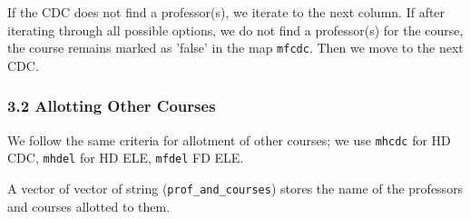 \documentclass{article}
\begin{document}
If the CDC does not find a professor(s), we iterate to the next column. If after iterating through all possible options, we do not find a professor(s) for the course, the course remains marked as 'false' in the map \texttt{mfcdc}. Then we move to the next CDC.

\subsubsection*{3.2 Allotting Other Courses}

We follow the same criteria for allotment of other courses; we use \texttt{mhcdc} for HD CDC, \texttt{mhdel} for HD ELE, \texttt{mfdel} FD ELE.

A vector of vector of string (\texttt{prof\_and\_courses}) stores the name of the professors and courses allotted to them.
\end{document}
